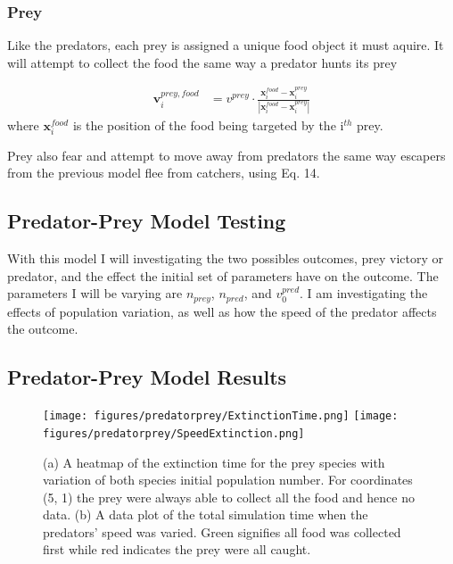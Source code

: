 \documentclass[%
11pt,
amsmath, amssymb,
aps,
pra
]{revtex4-2}
\begin{document}
\subsubsection{Prey}
Like the predators, each prey is assigned a unique food object it must aquire. It will attempt to collect the food the same
way a predator hunts its prey

\begin{align}
    \mathbf{v}_i^{prey,food} &= v^{prey} \cdot \frac{\mathbf{x}_i^{food} - \mathbf{x}_i^{prey}}{|\mathbf{x}_i^{food} - \mathbf{x}_i^{prey}|}
\end{align}
where \(\mathbf{x}_i^{food}\) is the position of the food being targeted by the i\(^{th}\) prey.

Prey also fear and attempt to move away from predators the same way escapers from the previous model flee from catchers, using
Eq. 14. 



\subsection{Predator-Prey Model Testing}
With this model I will investigating the two possibles outcomes, prey victory or predator, and the effect the initial
set of parameters have on the outcome. The parameters I will be varying are \(n_{prey}\), \(n_{pred}\), 
and \(v_0^{pred}\). I am investigating the effects of population variation, as well as how the speed of the predator 
affects the outcome.







\subsection{Predator-Prey Model Results}




\begin{figure}[htbp]
    \texttt{[image: figures/predatorprey/ExtinctionTime.png]}
    \texttt{[image: figures/predatorprey/SpeedExtinction.png]}
    \caption{(a) A heatmap of the extinction time for the prey species with variation of both species initial
    population number. For coordinates (5, 1) the prey were always able to collect all the food and hence no data.
    (b) A data plot of the total simulation time when the predators' speed was varied. Green signifies all food was collected
    first while red indicates the prey were all caught.}
    \label{fig:numberpredprey}
\end{figure}
\end{document}
